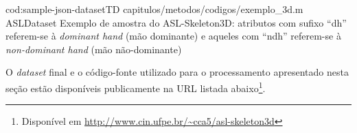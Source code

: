
\codigo
    {cod:sample-json-datasetTD}
    {capitulos/metodos/codigos/exemplo_3d.m}
    {ASLDataset}
    {Exemplo de amostra do ASL-Skeleton3D: atributos com sufixo ``dh'' referem-se à \textit{dominant hand} (mão dominante) e aqueles com ``ndh'' referem-se à \textit{non-dominant hand} (mão não-dominante)}
    {}

O \textit{dataset} final e o código-fonte utilizado para o processamento apresentado nesta seção estão disponíveis publicamente na URL listada abaixo\footnote{Disponível em \url{http://www.cin.ufpe.br/~cca5/asl-skeleton3d}}.
